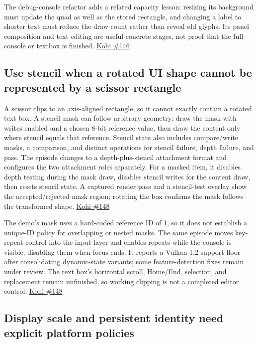 The debug-console refactor adds a related capacity lesson: resizing its background must update the quad as well as the stored rectangle, and changing a label to shorter text must reduce the draw count rather than reveal old glyphs. Its panel composition and text editing are useful concrete stages, not proof that the full console or textbox is finished. \href{https://www.youtube.com/watch?v=g7ZqqsMHZNo}{Kohi \#146}

\subsection{Use stencil when a rotated UI shape cannot be represented by a scissor rectangle}\label{05-engine-i-ch013-use-stencil-when-a-rotated-ui-shape-cannot-be-represented-by-a-scissor-rectangle}

\hypertarget{05-engine-i-ch013-use-stencil-when-a-rotated-ui-shape-cannot-be-represented-by-a-scissor-rectangle}{}

A scissor clips to an axis-aligned rectangle, so it cannot exactly contain a rotated text box. A stencil mask can follow arbitrary geometry: draw the mask with writes enabled and a chosen 8-bit reference value, then draw the content only where stencil equals that reference. Stencil state also includes compare/write masks, a comparison, and distinct operations for stencil failure, depth failure, and pass. The episode changes to a depth-plus-stencil attachment format and configures the two attachment roles separately. For a masked item, it disables depth testing during the mask draw, disables stencil writes for the content draw, then resets stencil state. A captured render pass and a stencil-test overlay show the accepted/rejected mask region; rotating the box confirms the mask follows the transformed shape. \href{https://www.youtube.com/watch?v=_VDD8wzUMuY}{Kohi \#148}

The demo's mask uses a hard-coded reference ID of 1, so it does not establish a unique-ID policy for overlapping or nested masks. The same episode moves key-repeat control into the input layer and enables repeats while the console is visible, disabling them when focus ends. It reports a Vulkan 1.2 support floor after consolidating dynamic-state variants; some feature-detection fixes remain under review. The text box's horizontal scroll, Home/End, selection, and replacement remain unfinished, so working clipping is not a completed editor control. \href{https://www.youtube.com/watch?v=_VDD8wzUMuY}{Kohi \#148}

\subsection{Display scale and persistent identity need explicit platform policies}\label{05-engine-i-ch013-display-scale-and-persistent-identity-need-explicit-platform-policies}

